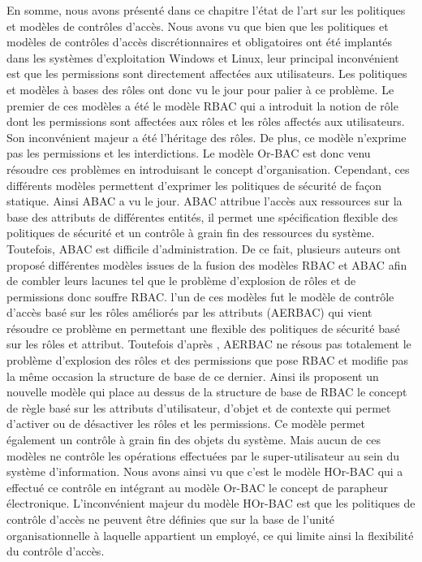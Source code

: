 \label{sectionSyntheseChap1}

En somme, nous avons présenté dans ce chapitre l'état de l'art sur les politiques et modèles de contrôles d'accès. Nous avons vu que bien que les politiques et modèles de contrôles d'accès discrétionnaires et obligatoires ont été implantés dans les systèmes d'exploitation Windows et Linux, leur principal inconvénient est que les permissions sont directement affectées aux utilisateurs. Les politiques
et modèles à bases des rôles ont donc vu le jour pour palier à ce problème. Le premier de ces modèles a été le modèle RBAC qui a introduit la notion de rôle dont les permissions sont affectées aux rôles et les rôles affectés aux utilisateurs. Son inconvénient majeur a été l'héritage des rôles. De plus, ce modèle n'exprime pas les permissions et les interdictions. Le modèle Or-BAC est donc venu résoudre ces
problèmes en introduisant le concept d'organisation. Cependant, ces différents modèles permettent d'exprimer les politiques de sécurité de façon statique. Ainsi ABAC a vu le jour. ABAC attribue l'accès aux ressources sur la base des attributs de différentes entités, il permet une spécification flexible des politiques de sécurité et un contrôle à grain fin des ressources du système. Toutefois, ABAC est difficile d'administration. De ce fait, plusieurs auteurs ont proposé différentes modèles issues de la fusion des modèles RBAC et ABAC afin de combler leurs lacunes tel que le problème d'explosion de rôles et de permissions donc souffre RBAC. l'un de ces modèles fut le modèle de contrôle d'accès basé sur les rôles améliorés par les attributs (AERBAC) qui vient résoudre ce problème en permettant une flexible des politiques de sécurité basé sur les rôles et attribut. Toutefois d'après \cite{singh19}, AERBAC ne résous pas totalement le problème d'explosion des rôles et des permissions que pose RBAC et modifie pas la même occasion la structure de base de ce dernier. Ainsi ils proposent un nouvelle modèle qui place au dessus de la structure de base de RBAC le concept de règle basé sur les attributs d'utilisateur, d'objet et de contexte qui permet d'activer ou de désactiver les rôles et les permissions. Ce modèle permet également un contrôle à grain fin des objets du système. Mais aucun de ces modèles ne contrôle les opérations effectuées par le super-utilisateur au sein du système d'information. Nous avons ainsi vu que c'est le modèle HOr-BAC qui a effectué ce contrôle en intégrant au modèle Or-BAC le concept de parapheur électronique. L'inconvénient majeur du modèle HOr-BAC est que les politiques de contrôle d'accès ne peuvent être définies que sur la base de l'unité organisationnelle à laquelle appartient un employé, ce qui limite ainsi la flexibilité du contrôle d'accès.

